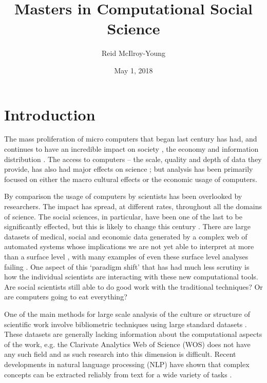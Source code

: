 \documentclass[12pt, a4paper]{article}
\author{Reid McIlroy-Young}
\title{Masters in Computational Social Science}
\date{May 1, 2018}
\begin{document}
\maketitle
\tableofcontents
\newpage
\listoffigures
\listoftables
\newpage
\doublespacing
\setcounter{page}{1}


\section{Introduction}

The mass proliferation of micro computers that began last century has had, and continues to have an incredible impact on society \citep{weizenbaum1972impact}, the economy \citep{gordon2000does} and information distribution \citep{berners2010world}. The access to computers -- the scale, quality and depth of data they provide, has also had major effects on science \citep{lazer2009life}; but analysis has been primarily focused on either the macro cultural effects \citep{pfaffenberger1988social} or the economic usage \citep{landauer1995trouble} of computers.

By comparison the usage of computers by scientists has been overlooked by researchers. The impact has spread, at different rates, throughout all the domains of science. The social sciences, in particular, have been one of the last to be significantly effected, but this is likely to change this century \citep{watts2007twenty}. There are large datasets of medical, social and economic data generated by a complex web of automated systems whose implications we are not yet able to interpret at more than a surface level \citep{kossinets2006empirical} \citep{back2010emotional}, with many examples of even these surface level analyses failing \citep{lazer2014parable} \citep{kramer2014experimental}. One aspect of this `paradigm shift' that has had much less scrutiny is how the individual scientists are interacting with these new computational tools. Are social scientists still able to do good work with the traditional techniques? Or are computers going to eat everything?

One of the main methods for large scale analysis of the culture or structure of scientific work involve bibliometric techniques \citep{de2009bibliometrics} using large standard datasets \citep[e.g.][]{Boyack2005, borner2010atlas, borner2015atlas, sugimoto2013global, shi2015weaving, evans_meta, skupin2013visualizing}. These datasets are generally lacking information about the computational aspects of the work, e.g. the  Clarivate Analytics Web of Science (WOS) does not have any such field \citep{mkdocs} and as such research into this dimension is difficult. Recent developments in natural language processing (NLP) have shown that complex concepts can be extracted reliably from text for a wide variety of tasks \citep{evans2016machine} \citep{foster2015tradition}.
\end{document}
